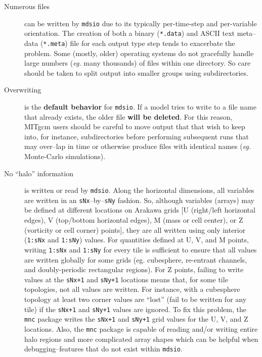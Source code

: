 \begin{description}
\item[Numerous files] can be written by \texttt{mdsio} due to its
  typically per-time-step and per-variable orientation.  The creation of
  both a binary (\texttt{*.data}) and ASCII text meta--data
  (\texttt{*.meta}) file for each output type step tends to exacerbate
  the problem.  Some (mostly, older) operating systems do not
  gracefully handle large numbers (\textit{eg.} many thousands) of
  files within one directory.  So care should be taken to split output
  into smaller groups using subdirectories.

\item[Overwriting] is the \textbf{default behavior} for
  \texttt{mdsio}.  If a model tries to write to a file name that
  already exists, the older file \textbf{will be deleted}.  For this
  reason, MITgcm users should be careful to move output that that wish
  to keep into, for instance, subdirectories before performing
  subsequent runs that may over--lap in time or otherwise produce
  files with identical names (\textit{eg.} Monte-Carlo simulations).

\item[No ``halo'' information] is written or read by \texttt{mdsio}.
  Along the horizontal dimensions, all variables are written in an
  \texttt{sNx}--by--\texttt{sNy} fashion.  So, although variables
  (arrays) may be defined at different locations on Arakawa grids [U
  (right/left horizontal edges), V (top/bottom horizontal edges), M
  (mass or cell center), or Z (vorticity or cell corner) points], they
  are all written using only interior (\texttt{1:sNx} and
  \texttt{1:sNy}) values.  For quantities defined at U, V, and M
  points, writing \texttt{1:sNx} and \texttt{1:sNy} for every tile is
  sufficient to ensure that all values are written globally for some
  grids (eg. cubesphere, re-entrant channels, and doubly-periodic
  rectangular regions).  For Z points, failing to write values at the
  \texttt{sNx+1} and \texttt{sNy+1} locations means that, for some
  tile topologies, not all values are written.  For instance, with a
  cubesphere topology at least two corner values are ``lost'' (fail to
  be written for any tile) if the \texttt{sNx+1} and \texttt{sNy+1}
  values are ignored.  To fix this problem, the \texttt{mnc} package
  writes the \texttt{sNx+1} and \texttt{sNy+1} grid values for the U,
  V, and Z locations.  Also, the \texttt{mnc} package is capable of
  reading and/or writing entire halo regions and more complicated
  array shapes which can be helpful when debugging--features that
  do not exist within \texttt{mdsio}.
\end{description}


